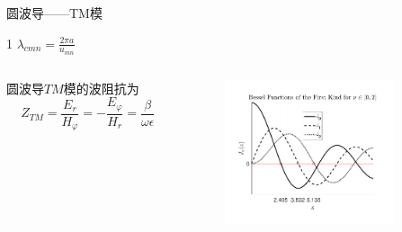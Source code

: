 \begin{frame}{圆波导——TM模}
    \begin{table}
        \centering
        \begin{threeparttable}[b]
            \caption{圆波导中$TM$模截止波长值}
            \begin{tablenotes}
                \item[1] \footnotesize{$\lambda_{cmn}=\frac{2\pi a}{u_{mn}}$}
            \end{tablenotes}
        \end{threeparttable}
    \end{table}
    \begin{columns}
        \begin{column}{0.4\linewidth}
            圆波导$TM$模的波阻抗为
            $$Z_{TM}=\frac{E_r}{H_{\varphi}}=-\frac{E_{\varphi}}{H_r}=\frac{\beta}{\omega\epsilon}$$
        \end{column}
        \begin{column}{0.6\linewidth}
            \begin{figure}
                \includegraphics[width=5cm]{Cha6//fig6-19.pdf}
            \end{figure}
        \end{column}
    \end{columns}
\end{frame}

